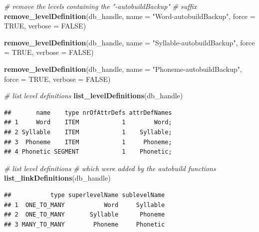 \documentclass[]{book}
\newenvironment{Shaded}{\begin{snugshade}}{\end{snugshade}}
\newcommand{\CommentTok}[1]{\textcolor[rgb]{0.56,0.35,0.01}{\textit{#1}}}
\newcommand{\DataTypeTok}[1]{\textcolor[rgb]{0.13,0.29,0.53}{#1}}
\newcommand{\KeywordTok}[1]{\textcolor[rgb]{0.13,0.29,0.53}{\textbf{#1}}}
\newcommand{\NormalTok}[1]{#1}
\newcommand{\OtherTok}[1]{\textcolor[rgb]{0.56,0.35,0.01}{#1}}
\newcommand{\StringTok}[1]{\textcolor[rgb]{0.31,0.60,0.02}{#1}}
\begin{document}
\begin{Shaded}
\begin{Highlighting}[]
\CommentTok{# remove the levels containing the "-autobuildBackup"}
\CommentTok{# suffix}
\KeywordTok{remove_levelDefinition}\NormalTok{(db_handle,}
                       \DataTypeTok{name =} \StringTok{"Word-autobuildBackup"}\NormalTok{,}
                       \DataTypeTok{force =} \OtherTok{TRUE}\NormalTok{,}
                       \DataTypeTok{verbose =} \OtherTok{FALSE}\NormalTok{)}

\KeywordTok{remove_levelDefinition}\NormalTok{(db_handle,}
                       \DataTypeTok{name =} \StringTok{"Syllable-autobuildBackup"}\NormalTok{,}
                       \DataTypeTok{force =} \OtherTok{TRUE}\NormalTok{,}
                       \DataTypeTok{verbose =} \OtherTok{FALSE}\NormalTok{)}

\KeywordTok{remove_levelDefinition}\NormalTok{(db_handle,}
                       \DataTypeTok{name =} \StringTok{"Phoneme-autobuildBackup"}\NormalTok{,}
                       \DataTypeTok{force =} \OtherTok{TRUE}\NormalTok{,}
                       \DataTypeTok{verbose =} \OtherTok{FALSE}\NormalTok{)}

\CommentTok{# list level definitions}
\KeywordTok{list_levelDefinitions}\NormalTok{(db_handle)}
\end{Highlighting}
\end{Shaded}

\begin{verbatim}
##       name    type nrOfAttrDefs attrDefNames
## 1     Word    ITEM            1        Word;
## 2 Syllable    ITEM            1    Syllable;
## 3  Phoneme    ITEM            1     Phoneme;
## 4 Phonetic SEGMENT            1    Phonetic;
\end{verbatim}

\begin{Shaded}
\begin{Highlighting}[]
\CommentTok{# list level definitions}
\CommentTok{# which were added by the autobuild functions}
\KeywordTok{list_linkDefinitions}\NormalTok{(db_handle)}
\end{Highlighting}
\end{Shaded}

\begin{verbatim}
##           type superlevelName sublevelName
## 1  ONE_TO_MANY           Word     Syllable
## 2  ONE_TO_MANY       Syllable      Phoneme
## 3 MANY_TO_MANY        Phoneme     Phonetic
\end{verbatim}
\end{document}
